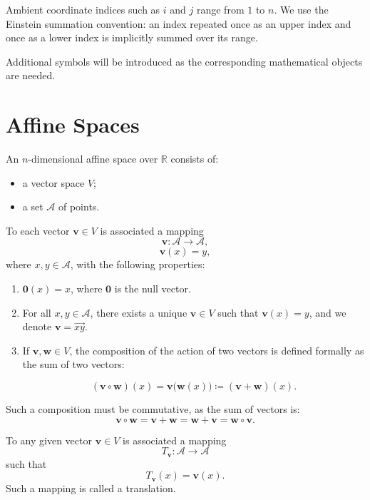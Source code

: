 \documentclass[12pt]{article}
\begin{document}
Ambient coordinate indices such as \(i\) and \(j\) range from \(1\) to
\(n\). We use the Einstein summation convention: an index repeated once
as an upper index and once as a lower index is implicitly summed over
its range.

Additional symbols will be introduced as the corresponding mathematical
objects are needed.

\section{Affine Spaces}

\begin{definition}
An \(n\)-dimensional affine space over \(\mathbb{R}\) consists of:
\begin{itemize}
    \item a vector space \(V\);
    \item a set \(\mathcal A\) of points.
\end{itemize}
\end{definition}

To each vector \(\mathbf{v} \in V\) is associated a mapping
\[
\mathbf{v} \colon \mathcal A \longrightarrow \mathcal A,
\]
\[
\mathbf{v}(x) = y,
\]
where \(x,y \in \mathcal A\), with the following properties:

\begin{enumerate}
    \item
    \(\mathbf{0}(x)=x\), where \(\mathbf{0}\) is the null vector.

    \item
    For all \(x,y\in \mathcal A\), there exists a unique \(\mathbf{v}\in V\)
    such that \(\mathbf{v}(x)=y\), and we denote
    \(\mathbf{v}=\overrightarrow{xy}\).

    \item
    If \(\mathbf{v},\mathbf{w}\in V\), the composition of the action
    of two vectors is defined formally as the sum of two vectors:
    
    \[(\mathbf{v}\circ\mathbf{w})(x)
    =\mathbf{v}\bigl(\mathbf{w}(x)\bigr)
    \coloneqq(\mathbf{v}+\mathbf{w})(x).\]

\end{enumerate}

Such a composition must be commutative, as the sum of vectors is:
\[
\mathbf{v}\circ\mathbf{w}
=
\mathbf{v}+\mathbf{w}
=
\mathbf{w}+\mathbf{v}
=
\mathbf{w}\circ\mathbf{v}.
\] 


\begin{definition}[Translation]
To any given vector \(\mathbf{v}\in V\) is associated a mapping
\[
T_{\mathbf{v}}\colon \mathcal A\longrightarrow \mathcal A
\]
such that
\[
T_{\mathbf{v}}(x)=\mathbf{v}(x).
\]
Such a mapping is called a translation.
\end{definition}
\end{document}
